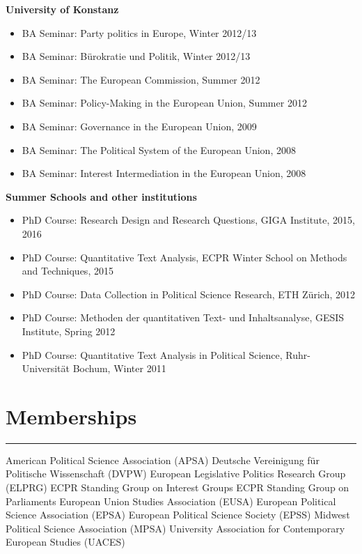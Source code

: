 \vspace{\baselineskip}

\textbf{University of Konstanz}
\begin{itemize}[topsep=0pt, noitemsep, leftmargin=3]
	\item BA Seminar: Party politics in Europe, Winter 2012/13
	\item BA Seminar: Bürokratie und Politik, Winter 2012/13
	\item BA Seminar: The European Commission, Summer 2012
	\item BA Seminar: Policy-Making in the European Union, Summer 2012
	\item BA Seminar: Governance in the European Union, 2009
	\item BA Seminar: The Political System of the European Union, 2008
	\item BA Seminar: Interest Intermediation in the European Union, 2008
\end{itemize}

\vspace{\baselineskip}

\textbf{Summer Schools and other institutions}
\begin{itemize}[topsep=0pt, noitemsep, leftmargin=3]
	\item PhD Course: Research Design and Research Questions, GIGA Institute, 2015, 2016
	\item PhD Course: Quantitative Text Analysis, ECPR Winter School on Methods and Techniques, 2015
	\item PhD Course: Data Collection in Political Science Research, ETH Zürich, 2012
	\item PhD Course: Methoden der quantitativen Text- und Inhaltsanalyse, GESIS Institute, Spring 2012
	\item PhD Course: Quantitative Text Analysis in Political Science, Ruhr-Universit\"at Bochum,  Winter 2011
\end{itemize}






\section*{Memberships}\vspace{-2em}\rule{\textwidth}{0.5pt}\nzb
American Political Science Association (APSA)\nzs
Deutsche Vereinigung f\"ur Politische Wissenschaft (DVPW)\nzs
European Legislative Politics Research Group (ELPRG)\nzs
ECPR Standing Group on Interest Groups\nzs
ECPR Standing Group on Parliaments\nzs
European Union Studies Association (EUSA)\nzs
European Political Science Association (EPSA)\nzs
European Political Science Society (EPSS)\nzs
Midwest Political Science Association (MPSA)\nzs
University Association for Contemporary European Studies (UACES)



